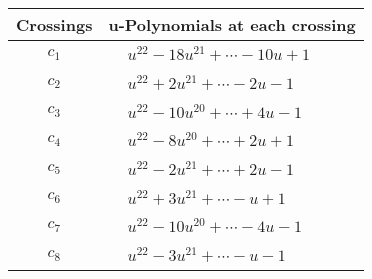 \documentclass[1p]{elsarticle_modified}
\theoremstyle{definition}
\begin{document}
\begin{tabular}{m{50pt}|m{274pt}}
Crossings & \hspace{64pt}u-Polynomials at each crossing \\
\hline $$\begin{aligned}c_{1}\end{aligned}$$&$\begin{aligned}
&u^{22}-18 u^{21}+\cdots-10 u+1
\end{aligned}$\\
\hline $$\begin{aligned}c_{2}\end{aligned}$$&$\begin{aligned}
&u^{22}+2 u^{21}+\cdots-2 u-1
\end{aligned}$\\
\hline $$\begin{aligned}c_{3}\end{aligned}$$&$\begin{aligned}
&u^{22}-10 u^{20}+\cdots+4 u-1
\end{aligned}$\\
\hline $$\begin{aligned}c_{4}\end{aligned}$$&$\begin{aligned}
&u^{22}-8 u^{20}+\cdots+2 u+1
\end{aligned}$\\
\hline $$\begin{aligned}c_{5}\end{aligned}$$&$\begin{aligned}
&u^{22}-2 u^{21}+\cdots+2 u-1
\end{aligned}$\\
\hline $$\begin{aligned}c_{6}\end{aligned}$$&$\begin{aligned}
&u^{22}+3 u^{21}+\cdots- u+1
\end{aligned}$\\
\hline $$\begin{aligned}c_{7}\end{aligned}$$&$\begin{aligned}
&u^{22}-10 u^{20}+\cdots-4 u-1
\end{aligned}$\\
\hline $$\begin{aligned}c_{8}\end{aligned}$$&$\begin{aligned}
&u^{22}-3 u^{21}+\cdots- u-1
\end{aligned}$\\

\end{tabular}
\end{document}
